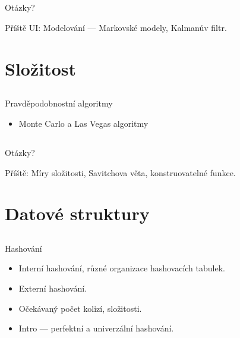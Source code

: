 \documentclass{beamer}
\begin{document}
\subsection{}
\begin{frame}{Otázky?}
\begin{center}
Příště UI: Modelování --- Markovské modely, Kalmanův filtr.
\end{center}
\end{frame}

\section{Složitost}

\subsection{}
\begin{frame}{Pravděpodobnostní algoritmy}
\begin{itemize}
\item Monte Carlo a Las Vegas algoritmy
\end{itemize}
\end{frame}

\subsection{}
\begin{frame}{Otázky?}
\begin{center}
Příště: Míry složitosti, Savitchova věta, konstruovatelné funkce.
\end{center}
\end{frame}

\section{Datové struktury}

\subsection{}
\begin{frame}{Hashování}
\begin{itemize}
\item Interní hashování, různé organizace hashovacích tabulek.
\item Externí hashování.
\item Očekávaný počet kolizí, složitosti.
\item Intro --- perfektní a univerzální hashování.
\end{itemize}
\end{frame}
\end{document}
